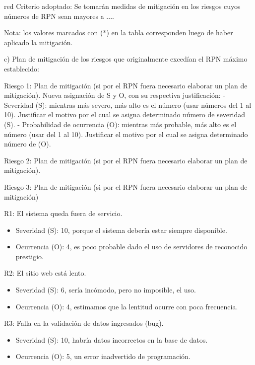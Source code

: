 \documentclass[11pt]{charter}
\begin{document}
\begin{consigna}{red}
Criterio adoptado: 
Se tomarán medidas de mitigación en los riesgos cuyos números de RPN sean mayores a ....

Nota: los valores marcados con (*) en la tabla corresponden luego de haber aplicado la mitigación.

c) Plan de mitigación de los riesgos que originalmente excedían el RPN máximo establecido:
 
Riesgo 1: Plan de mitigación (si por el RPN fuera necesario elaborar un plan de mitigación).
  Nueva asignación de S y O, con su respectiva justificación:
  - Severidad (S): mientras más severo, más alto es el número (usar números del 1 al 10).
          Justificar el motivo por el cual se asigna determinado número de severidad (S).
  - Probabilidad de ocurrencia (O): mientras más probable, más alto es el número (usar del 1 al 10).
          Justificar el motivo por el cual se asigna determinado número de (O).

Riesgo 2: Plan de mitigación (si por el RPN fuera necesario elaborar un plan de mitigación).
 
Riesgo 3: Plan de mitigación (si por el RPN fuera necesario elaborar un plan de mitigación)

\end{consigna}


R1: El sistema queda fuera de servicio.
\begin{itemize}
\item Severidad (S): 10, porque el sistema debería estar siempre disponible.
\item Ocurrencia (O): 4, es poco probable dado el uso de servidores de reconocido prestigio.
\end{itemize}

R2: El sitio web está lento.
\begin{itemize}
\item Severidad (S): 6, sería incómodo, pero no imposible, el uso.
\item Ocurrencia (O): 4, estimamos que la lentitud ocurre con poca frecuencia.
\end{itemize}

R3: Falla en la validación de datos ingresados (bug).
\begin{itemize}
\item Severidad (S): 10, habría datos incorrectos en la base de datos. 
\item Ocurrencia (O): 5, un error inadvertido de programación.
\end{itemize}
\end{document}
